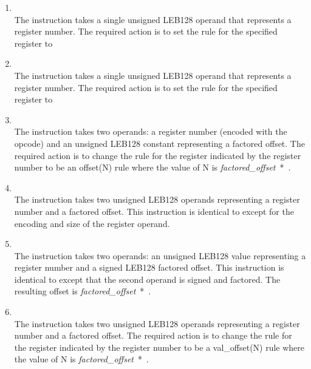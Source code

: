 \begin{enumerate}[1. ]

\item \textbf{\DWCFAundefinedTARG} \\
The \DWCFAundefinedNAME{} instruction takes a single unsigned
LEB128 operand that represents a register number. The required
action is to set the rule for the specified register to

\item \textbf{\DWCFAsamevalueTARG} \\
The \DWCFAsamevalueNAME{} instruction takes a single unsigned
LEB128 operand that represents a register number. The required
action is to set the rule for the specified register to

\item \textbf{\DWCFAoffsetTARG} \\
The \DWCFAoffsetNAME{} instruction takes two operands: a register
number (encoded with the opcode) and an unsigned LEB128
constant representing a factored offset. The required action
is to change the rule for the register indicated by the
register number to be an offset(N) rule where the value of
N is 
\bb
\mbox{\textit{factored\_offset} * }.
\eb

\item \textbf{\DWCFAoffsetextendedTARG} \\
The \DWCFAoffsetextendedNAME{} 
instruction takes two unsigned LEB128 
operands representing a register number and a factored
offset. This instruction is identical to
\DWCFAoffset{} 
except for the encoding and size of the register operand.

\item \textbf{\DWCFAoffsetextendedsfTARG} \\
The \DWCFAoffsetextendedsfNAME{} 
instruction takes two operands:
an unsigned LEB128 
value representing a register number and a
signed LEB128 factored offset. This instruction is identical
to \DWCFAoffsetextended{} 
except that the second operand is
signed and factored. The resulting offset is 
\mbox{\textit{factored\_offset} * }.

\item \textbf{\DWCFAvaloffsetTARG} \\
The \DWCFAvaloffsetNAME{} 
instruction takes two unsigned
LEB128 operands representing a register number and a
factored offset. The required action is to change the rule
for the register indicated by the register number to be a
val\_offset(N) rule where the value of N is 
\mbox{\textit{factored\_offset} * }.


\end{enumerate}
